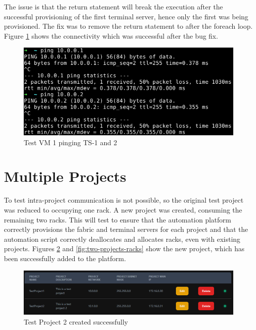 The issue is that the return statement will break the execution after the successful provisioning of the first terminal server, hence only the first was being provisioned. The fix was to remove the return statement to after the foreach loop. Figure \ref{fig:terminal-server-ping} shows the connectivity which was successful after the bug fix.

\begin{figure}[H]
    \centering
    \includegraphics[scale=1.5]{images/terminal-server-ping.png}
    \caption{Test VM 1 pinging TS-1 and 2}
    \label{fig:terminal-server-ping}
\end{figure}

\section{Multiple Projects}
To test intra-project communication is not possible, so the original test project was reduced to occupying one rack. A new project was created, consuming the remaining two racks. This will test to ensure that the automation platform correctly provisions the fabric and terminal servers for each project and that the automation script correctly deallocates and allocates racks, even with existing projects. Figures \ref{fig:two-projects} and \ref{fig:two-projects-racks} show the new project, which has been successfully added to the platform.

\begin{figure}[H]
    \centering
    \includegraphics[scale=1]{images/two-projects.png}
    \caption{Test Project 2 created successfully}
    \label{fig:two-projects}
\end{figure}


